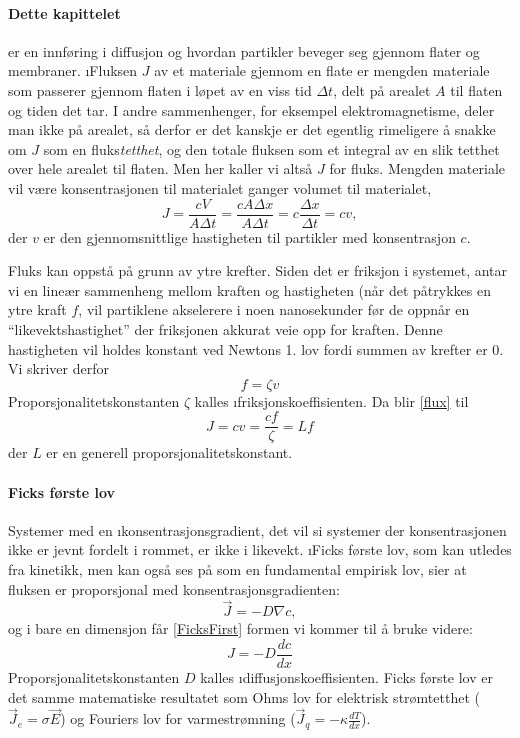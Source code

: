 
\paragraph{Dette kapittelet} er en innføring i diffusjon og hvordan partikler beveger seg gjennom flater og membraner.
\noindent \i{Fluksen} $J$ av et materiale gjennom en flate er mengden materiale som passerer gjennom flaten i løpet av en viss tid $\Delta t$, delt på arealet $A$ til flaten og tiden det tar. I andre sammenhenger, for eksempel elektromagnetisme, deler man ikke på arealet, så derfor er det kanskje er det egentlig rimeligere å snakke om $J$ som en fluks\emph{tetthet}, og den totale fluksen som et integral av en slik tetthet over hele arealet til flaten. Men her kaller vi altså $J$ for fluks. Mengden materiale vil være konsentrasjonen til materialet ganger volumet til materialet,
\begin{equation}
	\label{flux}
	J=\frac{cV}{A\Delta t}=\frac{cA\Delta x}{A\Delta t}=c\frac{\Delta x}{\Delta t}=cv,
\end{equation}
der $v$ er den gjennomsnittlige hastigheten til partikler med konsentrasjon $c$.

Fluks kan oppstå på grunn av ytre krefter. Siden det er friksjon i systemet, antar vi en lineær sammenheng mellom kraften og hastigheten (når det påtrykkes en ytre kraft $f$, vil partiklene akselerere i noen nanosekunder før de oppnår en ``likevektshastighet'' der friksjonen akkurat veie opp for kraften. Denne hastigheten vil holdes konstant ved Newtons 1. lov fordi summen av krefter er $0$. Vi skriver derfor
\begin{equation}
	f=\zeta v
\end{equation}
Proporsjonalitetskonstanten $\zeta$ kalles \i{friksjonskoeffisient}en. Da blir \eqref{flux} til
\begin{equation}
	J=cv=\frac{cf}{\zeta}=Lf
\end{equation}
der $L$ er en generell proporsjonalitetskonstant.

\paragraph{Ficks første lov} Systemer med en \i{konsentrasjonsgradient}, det vil si systemer der konsentrasjonen ikke er jevnt fordelt i rommet, er ikke i likevekt. \i{Ficks første lov}, som kan utledes fra kinetikk, men kan også ses på som en fundamental empirisk lov, sier at fluksen er proporsjonal med konsentrasjonsgradienten:
\begin{equation}
	\label{FicksFirst}
	\vec{J}=-D\nabla c,
\end{equation}
og i bare en dimensjon får \eqref{FicksFirst} formen vi kommer til å bruke videre:
\begin{equation}
	\label{FicksFirstSimple}
	J=-D\frac{dc}{dx}
\end{equation}
Proporsjonalitetskonstanten $D$ kalles \i{diffusjonskoeffisient}en. Ficks første lov er det samme matematiske resultatet som Ohms lov for elektrisk strømtetthet ($\vec{J}_e=\sigma \vec{E}$) og Fouriers lov for varmestrømning ($\vec{J}_q=-\kappa \frac{dT}{dx}$).


